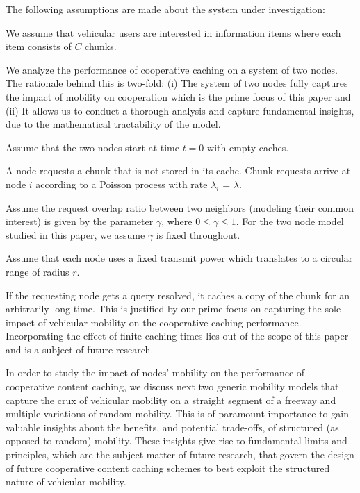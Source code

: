 \documentclass[conference,a4paper]{IEEEtran}
\begin{document}
The following assumptions are made about the system under investigation:
\begin{itemize*}
\item We assume that vehicular users are interested in information items where each item consists of $C$ chunks.
\item We analyze the performance of cooperative caching on a system of two nodes. The rationale behind this is two-fold: (i) The system of two nodes fully captures the impact of mobility on cooperation which is the prime focus of this paper and (ii) It allows us to conduct a thorough analysis and capture fundamental insights, due to the mathematical tractability of the model.
\item Assume that the two nodes start at time $t=0$ with empty caches.
\item A node requests a chunk that is not stored in its cache. Chunk requests arrive at node $i$ according to a Poisson process with rate $\lambda_i$ = $\lambda$.
\item Assume the request overlap ratio between two neighbors (modeling their common interest) is given by the parameter $\gamma$, where $0 \leq \gamma \leq 1$. For the two node model studied in this paper, we assume $\gamma$ is fixed throughout.
\item Assume that each node uses a fixed transmit power which translates to a circular range of radius $r$.
\item If the requesting node gets a query resolved, it caches a copy of the chunk for an arbitrarily long time. This is justified by our prime focus on capturing the sole impact of vehicular mobility on the cooperative caching performance. Incorporating the effect of finite caching times lies out of the scope of this paper and is a subject of future research.
\end{itemize*}

In order to study the impact of nodes' mobility on the performance of cooperative content caching, we discuss next two generic mobility models that capture the crux of vehicular mobility on a straight segment of a freeway and multiple variations of random mobility. This is of paramount importance to gain valuable insights about the benefits, and potential trade-offs, of structured (as opposed to random) mobility. These insights give rise to fundamental limits and principles, which are the subject matter of future research, that govern the design of future cooperative content caching schemes to best exploit the structured nature of vehicular mobility.
\end{document}
